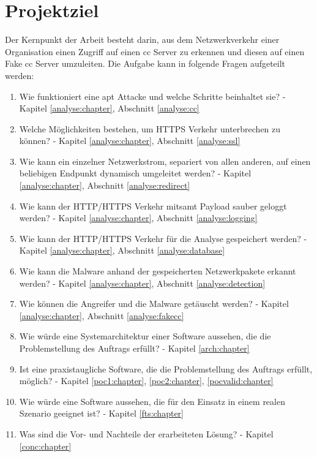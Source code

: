 \section{Projektziel}
\label{intro:projektziel}
Der Kernpunkt der Arbeit besteht darin, aus dem Netzwerkverkehr einer Organisation einen Zugriff auf einen \gls{cc} Server zu erkennen und diesen auf einen Fake \gls{cc} Server umzuleiten. Die Aufgabe kann in folgende Fragen aufgeteilt werden:

\begin{enumerate}
	\item Wie funktioniert eine \gls{apt} Attacke und welche Schritte beinhaltet sie? - Kapitel \ref{analyse:chapter}, Abschnitt \ref{analyse:cc}
	\item Welche Möglichkeiten bestehen, um HTTPS Verkehr unterbrechen zu können? - Kapitel \ref{analyse:chapter}, Abschnitt \ref{analyse:ssl}
	\item Wie kann ein einzelner Netzwerkstrom, separiert von allen anderen, auf einen beliebigen Endpunkt dynamisch umgeleitet werden? - Kapitel \ref{analyse:chapter}, Abschnitt \ref{analyse:redirect}
	\item Wie kann der HTTP/HTTPS Verkehr mitsamt Payload sauber geloggt werden? - Kapitel \ref{analyse:chapter}, Abschnitt \ref{analyse:logging}
	\item Wie kann der HTTP/HTTPS Verkehr für die Analyse gespeichert werden? - Kapitel \ref{analyse:chapter}, Abschnitt \ref{analyse:database}
	\item Wie kann die Malware anhand der gespeicherten Netzwerkpakete erkannt werden? - Kapitel \ref{analyse:chapter}, Abschnitt \ref{analyse:detection}
	\item Wie können die Angreifer und die Malware getäuscht werden? - Kapitel \ref{analyse:chapter}, Abschnitt \ref{analyse:fakecc}
	\item Wie würde eine Systemarchitektur einer Software aussehen, die die Problemstellung des Auftrags erfüllt? - Kapitel \ref{arch:chapter}
	\item Ist eine praxistaugliche Software, die die Problemstellung des Auftrags erfüllt, möglich? - Kapitel \ref{poc1:chapter}, \ref{poc2:chapter}, \ref{pocvalid:chapter}
	\item Wie würde eine Software aussehen, die für den Einsatz in einem realen Szenario geeignet ist? - Kapitel \ref{fts:chapter}
	\item Was sind die Vor- und Nachteile der erarbeiteten Lösung? - Kapitel \ref{conc:chapter}
\end{enumerate}


